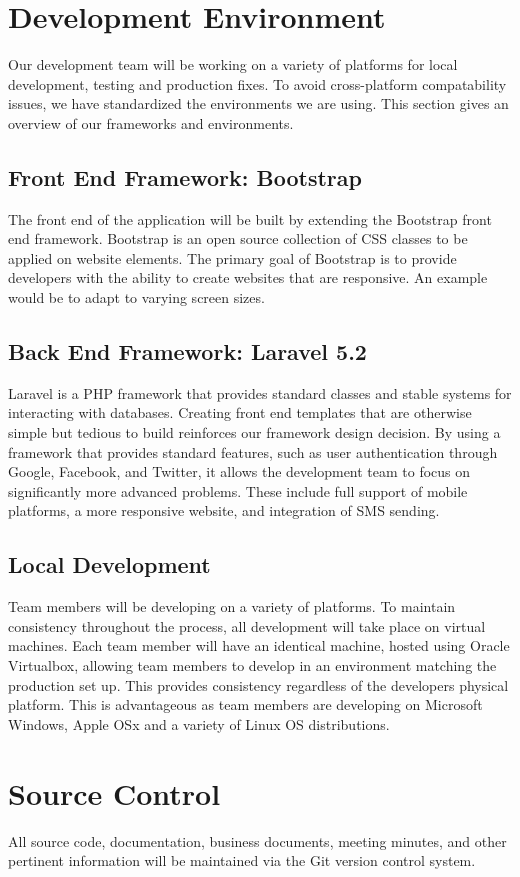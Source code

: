 \documentclass[14pt]{article}
\begin{document}
\section{Development Environment}
Our development team will be working on a variety of platforms for local development, testing and production fixes. To avoid cross-platform compatability issues, we have standardized the environments we are using. This section gives an overview of our frameworks and environments.
\subsection{Front End Framework: Bootstrap}
The front end of the application will be built by extending the Bootstrap front end framework. Bootstrap is an open source collection of CSS classes to be applied on website elements. The primary goal of Bootstrap is to provide developers with the ability to create websites that are responsive. An example would be to adapt to varying screen sizes.
\subsection{Back End Framework: Laravel 5.2}
Laravel is a PHP framework that provides standard classes and stable systems for interacting with databases. Creating front end templates that are otherwise simple but tedious to build reinforces our framework design decision. By using a framework that provides standard features, such as user authentication through Google, Facebook, and Twitter, it allows the development team to focus on significantly more advanced problems. These include full support of mobile platforms, a more responsive website, and integration of SMS sending.
\subsection{Local Development}
Team members will be developing on a variety of platforms. To maintain consistency throughout the process, all development will take place on virtual machines. Each team member will have an identical machine, hosted using Oracle Virtualbox, allowing team members to develop in an environment matching the production set up. This provides consistency regardless of the developers physical platform. This is advantageous as team members are developing on Microsoft Windows, Apple OSx and a variety of Linux OS distributions.

\section{Source Control}
All source code, documentation, business documents, meeting minutes, and other pertinent information will be maintained via the Git version control system.
\end{document}
